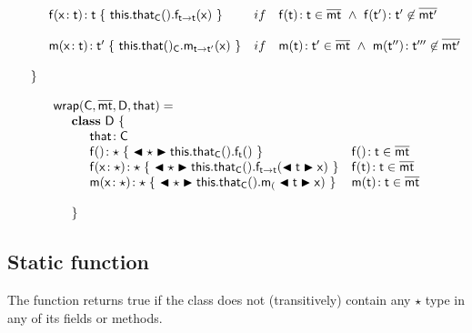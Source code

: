 \documentclass[acmlarge, anonymous, authordraft]{acmart}
\begin{document}
\[\begin{array}{@{}ll@{}l@{}r@{~}c@{~}r}
\\
\SPP \Mdef\f\x\t\t { ~\Set{\Get\this\that\C}\f\t\x~}
&    if\,\,\,\,\,\, \Mtype\f\t\t \in \bmt~\wedge~ \Mtype\f\tp\tp \not\in \bmtp \\
\\
\SPP \Mdef\m\x{\t}{\tp}{~\KCall{\this.\that()_{\C}}\m{\x}\t\tp~}
&    if\,\,\,\,\,\, \Mtype\m\t\tp\in\bmt ~\wedge~ \Mtype\m\tpp\tppp\not\in \bmtp \\
\\
\SP \}
\\
\end{array}\]

\[\begin{array}{@{}ll@{}l@{}r@{~}c@{~}r}
\wrapAny\C\bmt\D\that = \\
\SP \class~\D~\{\\
\SPP \Fdef \that \C\\ 
\SPP   \Mdefz\f\any{~\BehCast\any{\Get{{\Get\this\that\C}}\f\t}~}
&  \Mtype\f{}\t \in \bmt\\
\SPP   \Mdef\f\x\any\any{~\BehCast\any{\Set{\Get\this\that\C}\f\t{\bscast\t\x}}~}
&  \Mtype\f\t\t \in \bmt\\
\SPP   \Mdef\m\x\any\any {~\bscast\any{\Call{\Get\this\that\C}{\m_}{\bscast{\t}\x} }~}
&  \Mtype\m\t\t\in\b\mt \\
\\
\SP \}\\
\end{array}\]




\subsection{Static function}

The  function returns true if the class \D does not (transitively) contain any $\star$ type
in any of its fields or methods.


\begin{mathpar}



\end{mathpar}
\\
\end{document}
